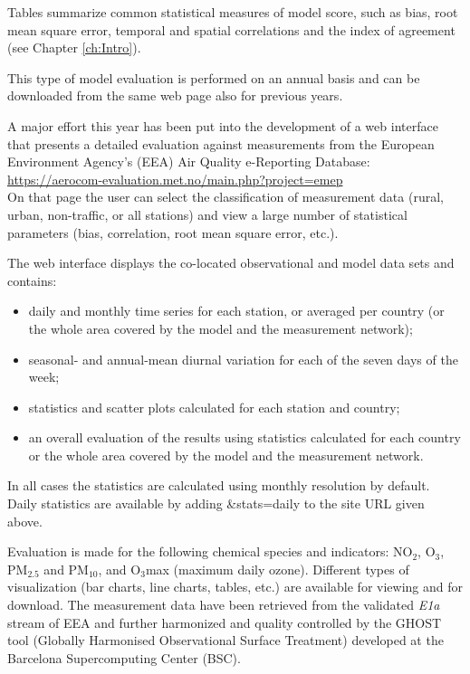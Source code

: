 Tables summarize common statistical measures of model score, such as bias, root mean square error, temporal and spatial correlations and the index of agreement (see Chapter \ref{ch:Intro}).

This type of model evaluation is performed on an annual basis and can be downloaded from the same web page also for previous years.\\

\vspace{1cm}

A major effort this year has been put into the development of a web
interface that presents a detailed evaluation against measurements from
the European Environment Agency's (EEA) Air Quality e-Reporting Database:\\
\url{https://aerocom-evaluation.met.no/main.php?project=emep}\\
On that page the user can select the classification of measurement data
(rural, urban, non-traffic, or all stations) and view a large number of
statistical parameters (bias, correlation, root mean square error, etc.).

The web interface displays the co-located observational and model data sets
and contains:
\begin{itemize}

\item daily and monthly time series for each station, or averaged per
  country (or the whole area covered by the model and the measurement network);
\item seasonal- and annual-mean diurnal variation for each of the seven days of the week;
\item statistics and scatter plots calculated for each station and country;
\item an overall evaluation of the results using statistics calculated for
  each country or the whole area covered by the model and the measurement network.
\end{itemize}
In all cases the statistics are calculated using monthly resolution
by default. Daily statistics are available by adding \&stats=daily to the
site URL given above.

Evaluation is made for the following chemical species and indicators:
NO$_{2}$, O$_{3}$, PM$_{2.5}$ and PM$_{10}$, and O$_{3}$max (maximum daily
ozone).
Different types of visualization (bar charts, line charts, tables,
etc.) are available for viewing and for download. The measurement data
have been retrieved from the validated {\em E1a} stream of EEA and further
harmonized and quality controlled by the GHOST tool (Globally Harmonised
Observational Surface Treatment) developed at the Barcelona Supercomputing
Center (BSC).

